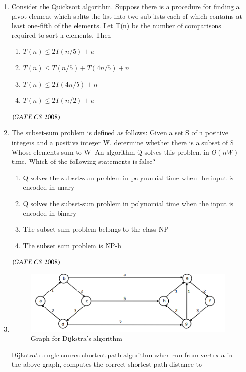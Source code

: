 \documentclass[journal, onecolumn]{IEEEtran}
\numberwithin{equation}{enumi}
\numberwithin{figure}{enumi}
\begin{document}
\begin{enumerate}
\item Consider the Quicksort algorithm. Suppose there is a procedure for finding a pivot element which splits the list into two sub-lists each of which contains at least one-fifth of the elements. Let T(n) be the number of comparisons required to sort n elements. Then
\vspace{-1em}%
\begin{multicols}{2}
\begin{enumerate}
    \item $T(n) \leq 2T(n/5) + n$
    \item $T(n) \leq T(n/5) + T(4n/5) + n$
    \item $T(n) \leq 2T(4n/5) + n$
    \item $T(n) \leq 2T(n/2) + n$
\end{enumerate}
\end{multicols}
\hfill $\left(GATE\ CS\  2008\right)$

\item The subset-sum problem is defined as follows: Given a set S of n positive integers and a positive integer W, determine whether there is a subset of S Whose elements sum to W. 
An algorithm Q solves this problem in $O(nW)$ time. Which of the following
statements is false? 

\begin{enumerate}
   \item Q solves the subset-sum problem in polynomial time when the input is
encoded in unary
   \item  Q solves the subset-sum problem in polynomial time when the input is encoded in binary
   \item The subset sum problem belongs to the class NP
   \item The subset sum problem is NP-h
\end{enumerate}
\hfill $\left(GATE\ CS\  2008\right)$
\bigskip

\item
\begin{figure}[H]
  \centering
  \includegraphics[width=0.5\columnwidth]{figs/fig4.png}
  \caption{Graph for Dijkstra's algorithm}
  \label{fig:4}
\end{figure}

 Dijkstra's single source shortest path algorithm when run from vertex a in the above graph, computes the correct shortest path distance to 


\end{enumerate}
\end{document}
